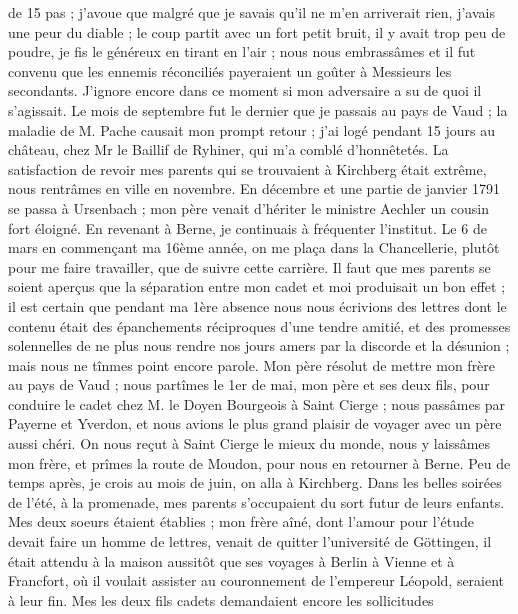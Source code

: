 \documentclass[12pt]{article}
\begin{document}
 de 15 pas ; j’avoue que malgré que je savais qu’il
ne m’en arriverait rien, j’avais une peur du diable ; le coup partit avec un fort petit bruit, il y
avait trop peu de poudre, je fis le généreux en tirant en l’air ; nous nous embrassâmes et il fut
convenu que les ennemis réconciliés payeraient un goûter à Messieurs les secondants. J’ignore encore
dans ce moment si mon adversaire a su de quoi il s’agissait. Le mois de septembre fut le dernier que
je passais au pays de Vaud ; la maladie de M. Pache causait mon prompt retour ; j’ai logé pendant 15
jours au château, chez Mr le Baillif de Ryhiner, qui m’a comblé d’honnêtetés. La satisfaction de
revoir mes parents qui se trouvaient à Kirchberg était extrême, nous rentrâmes en ville en novembre.
En décembre et une partie de janvier 1791 se passa à Ursenbach ; mon père venait d’hériter le
ministre Aechler un cousin fort éloigné. En revenant à Berne, je continuais à fréquenter l’institut.
Le 6 de mars en commençant ma 16ème année, on me plaça dans la Chancellerie, plutôt pour me faire
travailler, que de suivre cette carrière. Il faut que mes parents se soient aperçus que la
séparation entre mon cadet et moi produisait un bon effet ; il est certain que pendant ma 1ère
absence nous nous écrivions des lettres dont le contenu était des épanchements réciproques d’une
tendre amitié, et des promesses solennelles de ne plus nous rendre nos jours amers par la discorde
et la désunion ; mais nous ne tînmes point encore parole. Mon père résolut de mettre mon frère au
pays de Vaud ; nous partîmes le 1er de mai, mon père et ses deux fils, pour conduire le cadet chez
M. le Doyen Bourgeois à Saint Cierge ; nous passâmes par Payerne et Yverdon, et nous avions le plus
grand plaisir de voyager avec un père aussi chéri. On nous reçut à Saint Cierge le mieux du monde,
nous y laissâmes mon frère, et prîmes la route de Moudon, pour nous en retourner à Berne. Peu de
temps après, je crois au mois de juin, on alla à Kirchberg. Dans les belles soirées de l’été, à la
promenade, mes parents s’occupaient du sort futur de leurs enfants. Mes deux soeurs étaient établies
; mon frère aîné, dont l’amour pour l’étude devait faire un homme de lettres, venait de quitter
l’université de Göttingen, il était attendu à la maison aussitôt que ses voyages à Berlin à Vienne
et à Francfort, où il voulait assister au couronnement de l’empereur Léopold, seraient à leur fin.
Mes les deux fils cadets demandaient encore les sollicitudes
\end{document}
